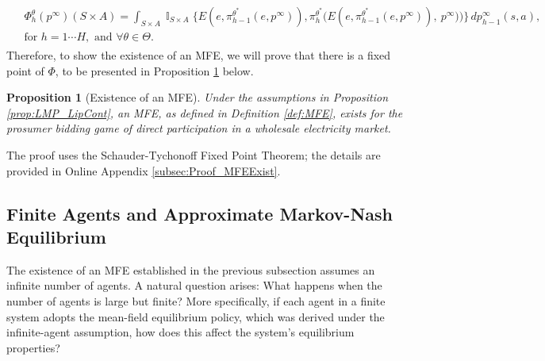 \documentclass{article}
\theoremstyle{definition}
\theoremstyle{plain}
\newtheorem{proposition}{Proposition}
\DeclareMathOperator{\I}{\mathbb{I}}
\begin{document}
\begin{align}
\begin{split}
&\Phi^{\theta}_h(p^{\infty})(S \times A)= \int_{S \times A} \I_{S \times A}\bigg\{E\left(e,\pi^{\theta^*}_{h-1}(e,p^{\infty}) \right),\pi_h^{\theta^*}\Big( E\left(e,\pi^{\theta^*}_{h-1}(e,p^{\infty})\right), \ p^{\infty})\Big)\bigg\} \, dp^{\infty}_{h-1}(s,a),\\
&\text{for } h=1\cdots H,\text{ and } \forall \theta \in \Theta.
\end{split}
\end{align}
Therefore, to show the existence of an MFE, we will prove that there is a fixed point of $\Phi$, to be presented in Proposition \ref{prop:MFE_exist} below. 

\begin{proposition}[Existence of an MFE]\label{prop:MFE_exist}
	Under the assumptions in Proposition \ref{prop:LMP_LipCont}, an MFE, as defined in Definition \ref{def:MFE}, exists for the prosumer bidding game of direct participation in a wholesale electricity market.
\end{proposition}
The proof uses the Schauder-Tychonoff Fixed Point Theorem; the details are provided in Online Appendix \ref{subsec:Proof_MFEExist}.

\subsection{Finite Agents and Approximate Markov-Nash Equilibrium}

The existence of an MFE established in the previous subsection assumes an infinite number of agents. A natural question arises: What happens when the number of agents is large but finite? More specifically, if each agent in a finite system adopts the mean-field equilibrium policy, which was derived under the infinite-agent assumption, how does this affect the system’s equilibrium properties? 
\end{document}
